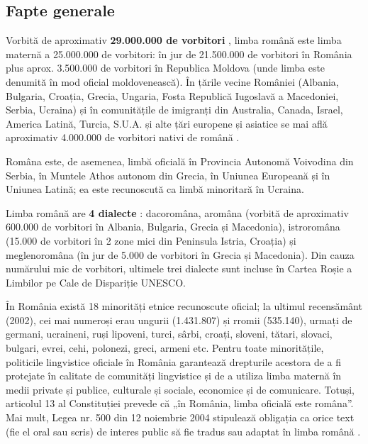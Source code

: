 \begin{multicols}{2}
\subsection{Fapte generale}
Vorbită de aproximativ \textbf{29.000.000 de vorbitori} \cite{vintila}, limba română este limba maternă a 25.000.000 de vorbitori: în jur de 21.500.000 de vorbitori în România \cite{stat1} plus aprox. 3.500.000 de vorbitori în Republica Moldova \cite{stat2} (unde limba este denumită în mod oficial moldovenească). În țările vecine României (Albania, Bulgaria, Croația, Grecia, Ungaria, Fosta Republică Iugoslavă a Macedoniei, Serbia, Ucraina) și în comunitățile de imigranți din Australia, Canada, Israel, America Latină, Turcia, S.U.A. și alte țări europene și asiatice se mai află aproximativ 4.000.000 de vorbitori nativi de română \cite{urlRom_diaspora}.

Româna este, de asemenea, limbă oficială în Provincia Autonomă Voivodina din Serbia, în Muntele Athos autonom din Grecia, în Uniunea Europeană și în Uniunea Latină; ea este recunoscută ca limbă minoritară în Ucraina.

Limba română are \textbf{4 dialecte} \cite{sala}: dacoromâna, aromâna (vorbită de aproximativ 600.000 de vorbitori în Albania, Bulgaria, Grecia și Macedonia), istroromâna (15.000 de vorbitori în 2 zone mici din Peninsula Istria, Croația) și meglenoromâna (în jur de 5.000 de vorbitori în Grecia și Macedonia). Din cauza numărului mic de vorbitori, ultimele trei dialecte sunt incluse în Cartea Roșie a Limbilor pe Cale de Dispariție UNESCO.

În România există 18 minorități etnice recunoscute oficial; la ultimul recensământ (2002), cei mai numeroși erau ungurii (1.431.807) și rromii (535.140), urmați de germani, ucraineni, ruși lipoveni, turci, sârbi, croați, sloveni, tătari, slovaci, bulgari, evrei, cehi, polonezi, greci, armeni etc. Pentru toate minoritățile, politicile lingvistice oficiale în România garantează drepturile acestora de a fi protejate în calitate de comunități lingvistice și de a utiliza limba maternă în medii private și publice, culturale și sociale, economice și de comunicare. Totuși, articolul 13 al Constituției prevede că „în România, limba oficială este româna”. Mai mult, Legea nr. 500 din 12 noiembrie 2004 stipulează obligația ca orice text (fie el oral sau scris) de interes public să fie tradus sau adaptat în limba română \cite{urlEFNIL}.


\end{multicols}
